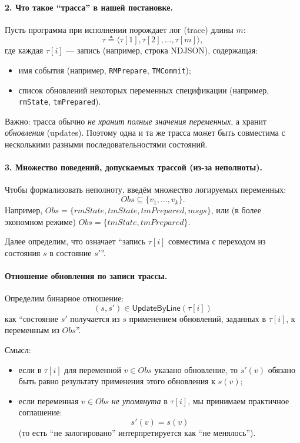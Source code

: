 \paragraph{2. Что такое ``трасса'' в нашей постановке.}
Пусть программа при исполнении порождает лог (trace) длины $m$:
\[
\tau \triangleq \langle \tau[1], \tau[2], \dots, \tau[m] \rangle,
\]
где каждая $\tau[i]$ — запись (например, строка NDJSON), содержащая:
\begin{itemize}
    \item имя события (например, \texttt{RMPrepare}, \texttt{TMCommit});
    \item список обновлений некоторых переменных спецификации
          (например, \texttt{rmState}, \texttt{tmPrepared}).
\end{itemize}

Важно: трасса обычно \emph{не хранит полные значения переменных},
а хранит \emph{обновления} (updates). Поэтому одна и та же трасса может быть
совместима с несколькими разными последовательностями состояний.

\paragraph{3. Множество поведений, допускаемых трассой (из-за неполноты).}
Чтобы формализовать неполноту, введём множество логируемых переменных:
\[
Obs \subseteq \{v_1,\dots,v_k\}.
\]
Например, $Obs = \{rmState, tmState, tmPrepared, msgs\}$,
или (в более экономном режиме) $Obs = \{tmState, tmPrepared\}$.

Далее определим, что означает ``запись $\tau[i]$ совместима с переходом
из состояния $s$ в состояние $s'$''.

\paragraph{Отношение обновления по записи трассы.}
Определим бинарное отношение:
\[
(s, s') \in \mathsf{UpdateByLine}(\tau[i])
\]
как ``состояние $s'$ получается из $s$ применением обновлений,
заданных в $\tau[i]$, к переменным из $Obs$''.

Смысл:
\begin{itemize}
    \item если в $\tau[i]$ для переменной $v \in Obs$ указано обновление,
    то $s'(v)$ обязано быть равно результату применения этого обновления к $s(v)$;
    \item если переменная $v \in Obs$ \emph{не упомянута} в $\tau[i]$,
    мы принимаем практичное соглашение:
    \[
      s'(v) = s(v)
    \]
    (то есть ``не залогировано'' интерпретируется как ``не менялось'').
\end{itemize}

